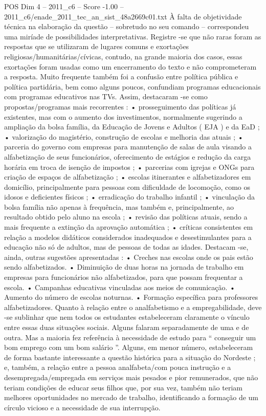 \begin{textsample}{POS Dim 4 – 2011\_c6 – Score -1.00 – 2011\_c6/enade\_2011\_tec\_an\_sist\_48a2669c01.txt}
À falta de objetividade técnica na elaboração da questão – sobretudo no seu comando – correspondeu uma miríade de possibilidades interpretativas.
Registre -se que não raras foram as respostas que se utilizaram de lugares comuns e exortações religiosas/humanitárias/cívicas, contudo, na grande maioria dos casos, essas exortações foram usadas como um encerramento do texto e não comprometeram a resposta.
Muito frequente também foi a confusão entre política pública e política partidária, bem como alguns poucos, confundiam programas educacionais com programas educativos nas TVs.
Assim, destacaram -se como propostas/programas mais recorrentes : • prosseguimento das políticas já existentes, mas com o aumento dos investimentos, normalmente sugerindo a ampliação da bolsa família, da Educação de Jovens e Adultos ( EJA ) e da EaD ; • valorização do magistério, construção de escolas e melhoria das atuais ; • parceria do governo com empresas para manutenção de salas de aula visando a alfabetização de seus funcionários, oferecimento de estágios e redução da carga horária em troca de isenção de impostos ; • parcerias com igrejas e ONGs para criação de espaços de alfabetização ; • escolas itinerantes e alfabetizadores em domicílio, principalmente para pessoas com dificuldade de locomoção, como os idosos e deficientes físicos ; • erradicação do trabalho infantil ; • vinculação da bolsa família não apenas à frequência, mas também e, principalmente, ao resultado obtido pelo aluno na escola ; • revisão das políticas atuais, sendo a mais frequente a extinção da aprovação automática ; • críticas consistentes em relação a modelos didáticos considerados inadequados e desestimulantes para a educação não só de adultos, mas de pessoas de todas as idades.
Destacam -se, ainda, outras sugestões apresentadas : • Creches nas escolas onde os pais estão sendo alfabetizados. • Diminuição de duas horas na jornada de trabalho em empresas para funcionários não alfabetizados, para que possam frequentar a escola. • Campanhas educativas vinculadas aos meios de comunicação. • Aumento do número de escolas noturnas. • Formação específica para professores alfabetizadores.
Quanto à relação entre o analfabetismo e a empregabilidade, deve -se sublinhar que nem todos os estudantes estabeleceram claramente o vínculo entre essas duas situações sociais.
Alguns falaram separadamente de uma e de outra.
Mas a maioria fez referência à necessidade de estudo para “ conseguir um bom emprego com um bom salário ”.
Alguns, em menor número, estabeleceram de forma bastante interessante a questão histórica para a situação do Nordeste ; e, também, a relação entre a pessoa analfabeta/com pouca instrução e a desempregada/empregada em serviços mais pesados e pior remunerados, que não teriam condições de educar seus filhos que, por sua vez, também não teriam melhores oportunidades no mercado de trabalho, identificando a formação de um círculo vicioso e a necessidade de sua interrupção.

\end{textsample}
